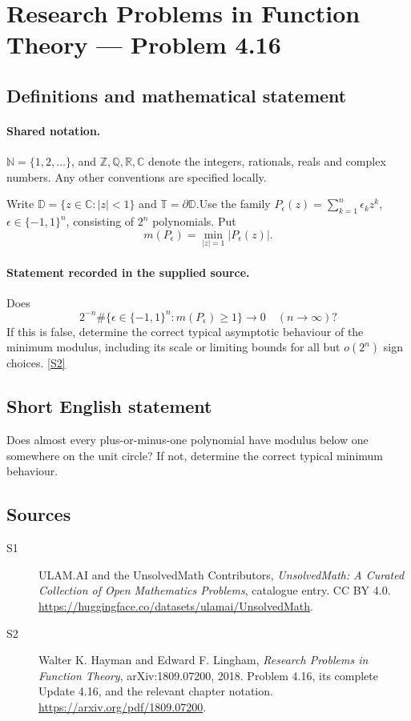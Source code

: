 \documentclass[11pt]{book}
\newcommand{\sref}[2]{\hyperlink{source:#1:#2}{[S#2]}}
\begin{document}
\section{Research Problems in Function Theory — Problem 4.16}\label{statement}

\subsection{Definitions and mathematical statement}

\paragraph{Shared notation.}$\mathbb N=\{1,2,\ldots\}$, and $\mathbb Z,\mathbb Q,\mathbb R,\mathbb C$ denote the integers, rationals, reals and complex numbers. Any other conventions are specified locally.


Write $\mathbb D=\{z\in\mathbb C:|z|<1\}$ and $\mathbb T=\partial\mathbb D$.Use the family $P_\epsilon(z)=\sum_{k=1}^n\epsilon_kz^k$, $\epsilon\in\{-1,1\}^n$, consisting of $2^n$ polynomials. Put
\[m(P_\epsilon)=\min_{|z|=1}|P_\epsilon(z)|.
\]
\paragraph{Statement recorded in the supplied source.}
Does
\[2^{-n}\#\{\epsilon\in\{-1,1\}^n:m(P_\epsilon)\ge1\}\longrightarrow0\quad(n\to\infty)?\]
If this is false, determine the correct typical asymptotic behaviour of the minimum modulus, including its scale or limiting bounds for all but $o(2^n)$ sign choices. \sref{statement}{2}
\subsection{Short English statement}
Does almost every plus-or-minus-one polynomial have modulus below one somewhere on the unit circle? If not, determine the correct typical minimum behaviour.
\subsection{Sources}
\begin{description}
\item[\hypertarget{source:statement:1}{S1}] ULAM.AI and the UnsolvedMath Contributors, \emph{UnsolvedMath: A Curated Collection of Open Mathematics Problems}, catalogue entry. CC BY 4.0. \url{https://huggingface.co/datasets/ulamai/UnsolvedMath}.
\item[\hypertarget{source:statement:2}{S2}] Walter K. Hayman and Edward F. Lingham, \emph{Research Problems in Function Theory}, arXiv:1809.07200, 2018. Problem 4.16, its complete Update 4.16, and the relevant chapter notation. \url{https://arxiv.org/pdf/1809.07200}.
\end{description}
\label{end:statement}
\end{document}
